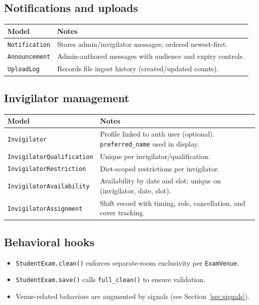 \subsection{Notifications and uploads}
\label{subsec:models:detail:notifications}

\begin{longtable}{p{}p{}}
\toprule
\textbf{Model} & \textbf{Notes} \\
\midrule
\texttt{Notification} & Stores admin/invigilator messages; ordered newest-first. \\
\texttt{Announcement} & Admin-authored messages with audience and expiry controls. \\
\texttt{UploadLog} & Records file ingest history (created/updated counts). \\
\bottomrule
\end{longtable}

\subsection{Invigilator management}
\label{subsec:models:detail:invigilators}

\begin{longtable}{p{}p{}}
\toprule
\textbf{Model} & \textbf{Notes} \\
\midrule
\texttt{Invigilator} & Profile linked to auth user (optional). \texttt{preferred\_name} used in display. \\
\texttt{InvigilatorQualification} & Unique per invigilator/qualification. \\
\texttt{InvigilatorRestriction} & Diet-scoped restrictions per invigilator. \\
\texttt{InvigilatorAvailability} & Availability by date and slot; unique on (invigilator, date, slot). \\
\texttt{InvigilatorAssignment} & Shift record with timing, role, cancellation, and cover tracking. \\
\bottomrule
\end{longtable}

\subsection{Behavioral hooks}
\label{subsec:models:detail:hooks}

\begin{itemize}
  \item \texttt{StudentExam.clean()} enforces separate-room exclusivity per \texttt{ExamVenue}.
  \item \texttt{StudentExam.save()} calls \texttt{full\_clean()} to ensure validation.
  \item Venue-related behaviors are augmented by signals (see Section~\ref{sec:signals}).
\end{itemize}
